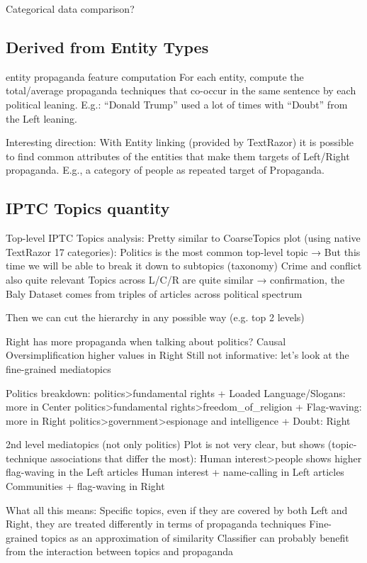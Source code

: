 Categorical data comparison?

\subsection{Derived from Entity Types}

entity propaganda feature computation
For each entity, compute the total/average propaganda techniques that co-occur in the same sentence by each political leaning. E.g.: “Donald Trump” used a lot of times with “Doubt” from the Left leaning.

Interesting direction:
With Entity linking (provided by TextRazor) it is possible to find common attributes of the entities that make them targets of Left/Right propaganda. E.g., a category of people as repeated target of Propaganda.

\subsection{IPTC Topics quantity}

Top-level IPTC Topics analysis:
Pretty similar to CoarseTopics plot (using native TextRazor 17 categories):
Politics is the most common top-level topic → But this time we will be able to break it down to subtopics (taxonomy)
Crime and conflict also quite relevant
Topics across L/C/R are quite similar → confirmation, the Baly Dataset comes from triples of articles across political spectrum

Then we can cut the hierarchy in any possible way (e.g. top 2 levels)

Right has more propaganda when talking about politics?
Causal Oversimplification higher values in Right
Still not informative: let’s look at the fine-grained mediatopics

Politics breakdown:
politics>fundamental rights + Loaded Language/Slogans: more in Center
politics>fundamental rights>freedom\_of\_religion + Flag-waving: more in Right
politics>government>espionage and intelligence + Doubt: Right

2nd level mediatopics (not only politics)
Plot is not very clear, but shows (topic-technique associations that differ the most):
Human interest>people shows higher flag-waving in the Left articles
Human interest + name-calling in Left articles
Communities + flag-waving in Right

What all this means:
Specific topics, even if they are covered by both Left and Right, they are treated differently in terms of propaganda techniques
Fine-grained topics as an approximation of similarity
Classifier can probably benefit from the interaction between topics and propaganda


